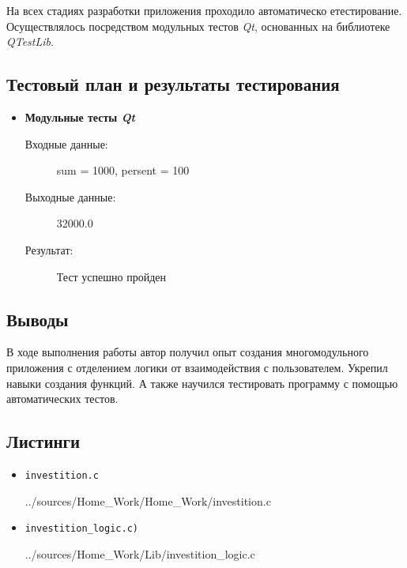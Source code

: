 \documentclass[12pt,a4paper]{report}
\begin{document}
На всех стадиях разработки приложения проходило автоматическо етестирование. Осуществлялось посредством модульных тестов \textit{Qt}, основанных на библиотеке  \textit{QTestLib}. 

\subsection{Тестовый план и результаты тестирования}
\begin{itemize}

\item \textbf{Модульные тесты \textit{Qt}}
\begin{description}
\hspace{\parindent}
\begin{flushleft}
\begin{description}
\item[Входные данные:] sum = 1000, persent = 100
\item[Выходные данные:] 32000.0
\item[Результат:] Тест успешно пройден
\end{description}
\end{flushleft}
\end{description}
\end{itemize}
\subsection{Выводы}
\hspace{\parindent}
В ходе выполнения работы автор получил опыт создания многомодульного приложения с отделением логики от взаимодействия с пользователем. Укрепил навыки создания функций. А также научился тестировать программу с помощью автоматических тестов.

\subsection*{Листинги}
\begin{itemize}
\item[] \verb-investition.c-

{../sources/Home_Work/Home_Work/investition.c}

\item[] \verb-investition_logic.c)-

{../sources/Home_Work/Lib/investition_logic.c}
\end{itemize}
%
\end{document}
